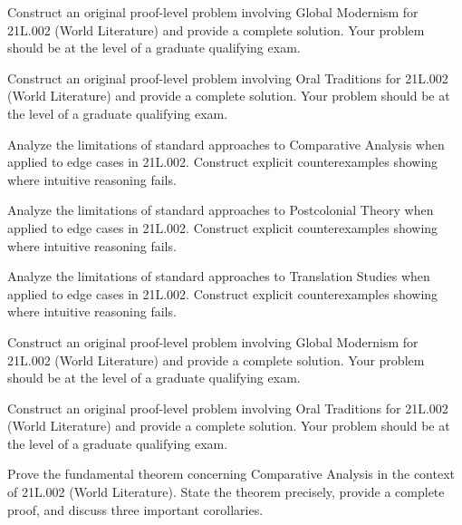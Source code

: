 \documentclass[12pt,a4paper]{exam}
\begin{document}
\begin{questions}
\vspace{0.3cm}

\question[6]
Construct an original proof-level problem involving Global Modernism for 21L.002 (World Literature) and provide a complete solution. Your problem should be at the level of a graduate qualifying exam.

\vspace{0.3cm}

\question[4]
Construct an original proof-level problem involving Oral Traditions for 21L.002 (World Literature) and provide a complete solution. Your problem should be at the level of a graduate qualifying exam.

\vspace{0.3cm}

\question[5]
Analyze the limitations of standard approaches to Comparative Analysis when applied to edge cases in 21L.002. Construct explicit counterexamples showing where intuitive reasoning fails.

\vspace{0.3cm}

\question[3]
Analyze the limitations of standard approaches to Postcolonial Theory when applied to edge cases in 21L.002. Construct explicit counterexamples showing where intuitive reasoning fails.

\vspace{0.3cm}

\question[2]
Analyze the limitations of standard approaches to Translation Studies when applied to edge cases in 21L.002. Construct explicit counterexamples showing where intuitive reasoning fails.

\vspace{0.3cm}

\question[2]
Construct an original proof-level problem involving Global Modernism for 21L.002 (World Literature) and provide a complete solution. Your problem should be at the level of a graduate qualifying exam.

\vspace{0.3cm}

\question[6]
Construct an original proof-level problem involving Oral Traditions for 21L.002 (World Literature) and provide a complete solution. Your problem should be at the level of a graduate qualifying exam.

\vspace{0.3cm}

\question[4]
Prove the fundamental theorem concerning Comparative Analysis in the context of 21L.002 (World Literature). State the theorem precisely, provide a complete proof, and discuss three important corollaries.


\end{questions}
\end{document}
